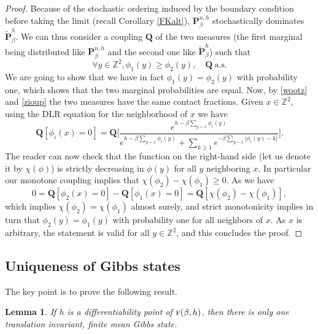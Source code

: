 \documentclass[JEP,XML,SOM,Unicode, NoFloatCountersInSection]{cedram}
\numberwithin{equation}{section}
\theoremstyle{plain}
\newtheorem{lemma}[theorem]{Lemma}
\theoremstyle{definition}
\newcommand{\bP}{{\ensuremath{\mathbf P}} }
\newcommand{\bQ}{{\ensuremath{\mathbf Q}} }
\newcommand{\bbZ}{{\ensuremath{\mathbb Z}} }
\newcommand{\gb}{\beta}
\newcommand{\tf}{\textsc{f}}
\begin{document}
\begin{proof}
Because of the stochastic ordering induced by the boundary condition before taking the limit (recall Corollary \ref{FKalt}),
$\bP^{n,h}_{\gb}$ stochastically dominates $\tilde \bP^{h}_{\gb}$.
We can thus consider a coupling $\bQ$ of the two measures (the first marginal being distributed like $\bP^{n,h}_{\gb}$ and the second one like $\tilde \bP^{h}_{\gb}$) such that
\begin{equation*}
\forall y\in \bbZ^2, \phi_1(y)\ge \phi_2(y), \quad \bQ\ \text{a.s.}
\end{equation*}
We are going to show that we have in fact $\phi_1(y)= \phi_2(y)$ with probability one, which shows that the two marginal probabilities are equal.
Now, by \eqref{wootz} and \eqref{zioup} the two measures have the same contact fractions.
Given $x\in \bbZ^2$, using the DLR equation for the neighborhood of $x$ we have
\begin{equation}\label{superdlr}
\bQ[\phi_i(x)=0]=
\bQ\biggl[ \frac{e^{h-\gb\sum_{y\sim x}\phi_i(y)}}{e^{h-\gb\sum_{y\sim x}\phi_i(y)}+ \sum_{k\ge 1} e^{-\gb\sum_{y\sim x}|\phi_i(y)-k| }} \biggr].
\end{equation}
The reader can now check that the function on the right-hand side (let us denote it by $\chi(\phi)$) is strictly decreasing in $\phi(y)$ for all $y$ neighboring $x$. In particular our monotone coupling implies that $\chi(\phi_2)-\chi(\phi_1)\ge 0$.
As we have
\begin{equation}
0= \bQ[\phi_2(x)=0]-\bQ[\phi_1(x)=0]
=\bQ\left[ \chi(\phi_2)-\chi(\phi_1)\right],
\end{equation}
which implies $\chi(\phi_2)=\chi(\phi_1)$ almost surely, and strict monotonicity implies in turn that
$ \phi_2(y)=\phi_1(y)$ with probability one for all neighbors of $x$. As $x$ is arbitrary, the statement is valid for all $y \in \bbZ^2$, and this concludes the proof.
\end{proof}

\subsection{Uniqueness of Gibbs states}\label{unik}

The key point is to prove the following result.
\begin{lemma}\label{labon}
If $h$ is a differentiability point of $\tf(\gb,h)$, then there is only one translation invariant, finite mean Gibbs state.
\end{lemma}
\end{document}
